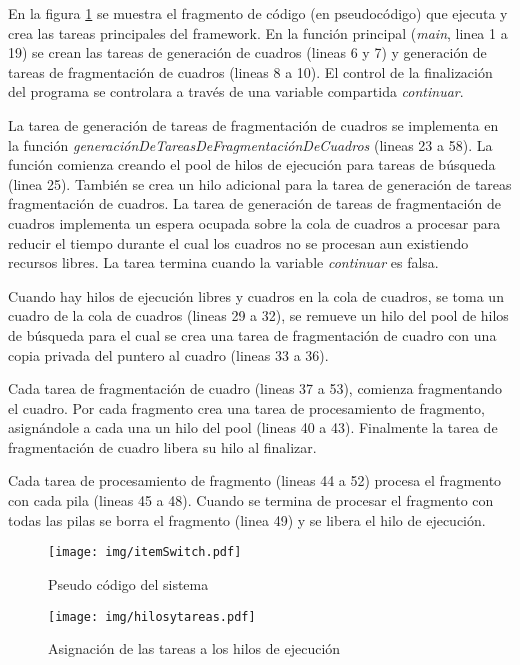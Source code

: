 En la figura \ref{codigo} se muestra el fragmento de código (en pseudocódigo)
que ejecuta y crea las tareas principales del framework. En la función principal
(\emph{main}, linea 1 a 19) se crean las tareas de generación de cuadros (lineas
6 y 7) y generación de tareas de fragmentación de cuadros (lineas 8 a 10). El
control de la finalización del programa se controlara a través de una variable
compartida \emph{continuar}.

La tarea de generación de tareas de fragmentación de cuadros se implementa en la
función \emph{generaciónDeTareasDeFragmentaciónDeCuadros} (lineas 23 a 58). La
función comienza creando el pool de hilos de ejecución para tareas de búsqueda
(linea 25). También se crea un hilo adicional para la tarea de generación de
tareas fragmentación de cuadros. La tarea de generación de tareas de
fragmentación de cuadros implementa un espera ocupada sobre la cola de cuadros a
procesar para reducir el tiempo durante el cual los cuadros no se procesan aun
existiendo recursos libres. La tarea termina cuando la variable \emph{continuar}
es falsa.

Cuando hay hilos de ejecución libres y cuadros en la cola de cuadros, se toma un
cuadro de la cola de cuadros (lineas 29 a 32), se remueve un hilo del pool de
hilos de búsqueda para el cual se crea una tarea de fragmentación de cuadro con
una copia privada del puntero al cuadro (lineas 33 a 36).

Cada tarea de fragmentación de cuadro (lineas 37 a 53), comienza fragmentando el
cuadro. Por cada fragmento crea una tarea de procesamiento de fragmento,
asignándole a cada una un hilo del pool (lineas 40 a 43). Finalmente la tarea de
fragmentación de cuadro libera su hilo al finalizar.

Cada tarea de procesamiento de fragmento (lineas 44 a 52) procesa el fragmento
con cada pila (lineas 45 a 48). Cuando se termina de procesar el fragmento con
todas las pilas se borra el fragmento (linea 49) y se libera el hilo de
ejecución.

\begin{figure}[!h]

	\centering

	\texttt{[image: img/itemSwitch.pdf]}

	\caption{Pseudo código del sistema}

	\label{codigo}

\end{figure}

\begin{figure}[!h]

	\texttt{[image: img/hilosytareas.pdf]}

	\caption{Asignación de las tareas a los hilos de ejecución}

	\label{hilosytareas}

\end{figure}

